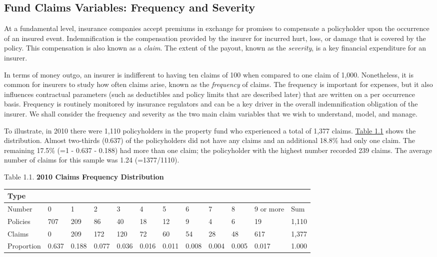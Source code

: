 \documentclass[
]{book}
\begin{document}
\hypertarget{S:OutComes}{%
\subsection{Fund Claims Variables: Frequency and Severity}\label{S:OutComes}}

At a fundamental level, insurance companies accept premiums in exchange for promises to compensate a policyholder upon the occurrence
of an insured event. Indemnification is the compensation provided by the insurer for incurred hurt, loss, or damage that is covered by the policy. This compensation is also known as a \emph{claim}. The extent of the payout, known as the \emph{severity}, is a key financial expenditure for an insurer.

In terms of money outgo, an insurer is indifferent to having ten claims of 100 when compared to one claim of 1,000. Nonetheless, it is common for
insurers to study how often claims arise, known as the \emph{frequency} of
claims. The frequency is important for expenses, but it also influences
contractual parameters (such as deductibles and policy limits that are described later) that are
written on a per occurrence basis. Frequency is routinely monitored by insurance
regulators and can be a key driver in the overall indemnification
obligation of the insurer. We shall consider the frequency and severity as the two main claim variables that we wish to understand, model, and manage.

To illustrate, in 2010 there were 1,110 policyholders in the property fund who experienced a total of 1,377 claims. \protect\hyperlink{tab:1.1}{Table 1.1} shows the distribution. Almost two-thirds (0.637) of the policyholders did not have any claims and an additional 18.8\% had only one claim. The remaining 17.5\%
(=1 - 0.637 - 0.188) had more than one claim; the policyholder with the highest number recorded 239 claims. The average number of claims for
this sample was 1.24 (=1377/1110).

Table 1.1. \textbf{2010 Claims Frequency Distribution}

\begin{longtable}[]{@{}llllllllllll@{}}
\toprule
Type & & & & & & & & & & & \\
\midrule
\endhead
Number & 0 & 1 & 2 & 3 & 4 & 5 & 6 & 7 & 8 & 9 or more & Sum \\
Policies & 707 & 209 & 86 & 40 & 18 & 12 & 9 & 4 & 6 & 19 & 1,110 \\
Claims & 0 & 209 & 172 & 120 & 72 & 60 & 54 & 28 & 48 & 617 & 1,377 \\
Proportion & 0.637 & 0.188 & 0.077 & 0.036 & 0.016 & 0.011 & 0.008 & 0.004 & 0.005 & 0.017 & 1.000 \\
\bottomrule
\end{longtable}
\end{document}
